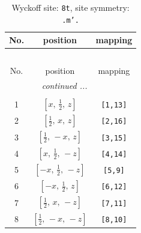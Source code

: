 \documentclass[fleqn,8pt]{jsarticle}
\begin{document}
\renewcommand{\arraystretch}{1.2}
\begin{longtable}{ccc}
\caption{Wyckoff site: {\tt 8t}, site symmetry: {\tt .m'.}}
 \\
 \hline \hline
No. & position & mapping \\ \hline \endfirsthead

\multicolumn{2}{l}{\tablename\ \thetable{}} \\
 \hline \hline
No. & position & mapping \\ \hline \endhead

 \hline \hline
\multicolumn{2}{r}{\footnotesize\it continued ...} \\ \endfoot

 \hline \hline
\multicolumn{2}{r}{} \\ \endlastfoot

1 & $\left[ x,\, \frac{1}{2},\, z \right]$ & {\tt [1,13]} \\ \hline
2 & $\left[ \frac{1}{2},\, x,\, z \right]$ & {\tt [2,16]} \\ \hline
3 & $\left[ \frac{1}{2},\, - x,\, z \right]$ & {\tt [3,15]} \\ \hline
4 & $\left[ x,\, \frac{1}{2},\, - z \right]$ & {\tt [4,14]} \\ \hline
5 & $\left[ - x,\, \frac{1}{2},\, - z \right]$ & {\tt [5,9]} \\ \hline
6 & $\left[ - x,\, \frac{1}{2},\, z \right]$ & {\tt [6,12]} \\ \hline
7 & $\left[ \frac{1}{2},\, x,\, - z \right]$ & {\tt [7,11]} \\ \hline
8 & $\left[ \frac{1}{2},\, - x,\, - z \right]$ & {\tt [8,10]} \\
\end{longtable}
\renewcommand{\arraystretch}{1.2}
\end{document}
